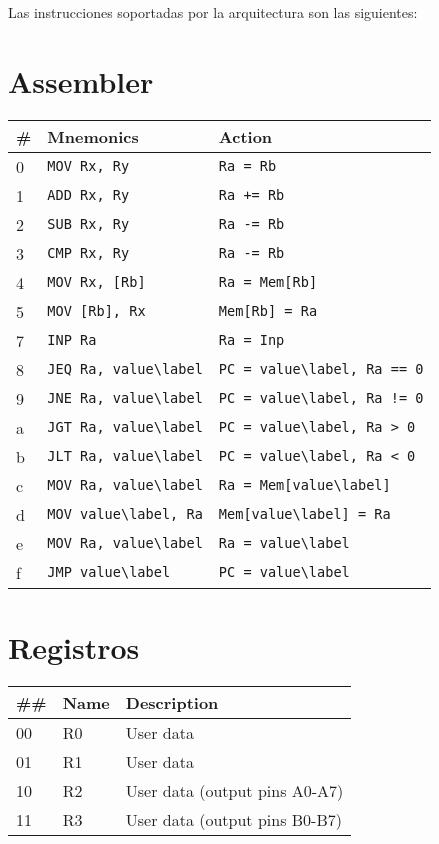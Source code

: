 \documentclass[12pt,twoside]{templates/unerthesis}
\begin{document}
Las instrucciones soportadas por la arquitectura son las siguientes:

\hypertarget{assembler}{%
\section{Assembler}\label{assembler}}

\begin{longtable}[]{@{}lll@{}}
\toprule
\# & Mnemonics & Action\tabularnewline
\midrule
\endhead
0 & \texttt{MOV\ Rx,\ Ry} & \texttt{Ra\ =\ Rb}\tabularnewline
1 & \texttt{ADD\ Rx,\ Ry} & \texttt{Ra\ +=\ Rb}\tabularnewline
2 & \texttt{SUB\ Rx,\ Ry} & \texttt{Ra\ -=\ Rb}\tabularnewline
3 & \texttt{CMP\ Rx,\ Ry} & \texttt{Ra\ -=\ Rb}\tabularnewline
4 & \texttt{MOV\ Rx,\ {[}Rb{]}} & \texttt{Ra\ =\ Mem{[}Rb{]}}\tabularnewline
5 & \texttt{MOV\ {[}Rb{]},\ Rx} & \texttt{Mem{[}Rb{]}\ =\ Ra}\tabularnewline
7 & \texttt{INP\ Ra} & \texttt{Ra\ =\ Inp}\tabularnewline
8 & \texttt{JEQ\ Ra,\ value\textbackslash{}\textbar{}label} & \texttt{PC\ =\ value\textbackslash{}\textbar{}label,\ Ra\ ==\ 0}\tabularnewline
9 & \texttt{JNE\ Ra,\ value\textbackslash{}\textbar{}label} & \texttt{PC\ =\ value\textbackslash{}\textbar{}label,\ Ra\ !=\ 0}\tabularnewline
a & \texttt{JGT\ Ra,\ value\textbackslash{}\textbar{}label} & \texttt{PC\ =\ value\textbackslash{}\textbar{}label,\ Ra\ \textgreater{}\ 0}\tabularnewline
b & \texttt{JLT\ Ra,\ value\textbackslash{}\textbar{}label} & \texttt{PC\ =\ value\textbackslash{}\textbar{}label,\ Ra\ \textless{}\ 0}\tabularnewline
c & \texttt{MOV\ Ra,\ value\textbackslash{}\textbar{}label} & \texttt{Ra\ =\ Mem{[}value\textbackslash{}\textbar{}label{]}}\tabularnewline
d & \texttt{MOV\ value\textbackslash{}\textbar{}label,\ Ra} & \texttt{Mem{[}value\textbackslash{}\textbar{}label{]}\ =\ Ra}\tabularnewline
e & \texttt{MOV\ Ra,\ value\textbackslash{}\textbar{}label} & \texttt{Ra\ =\ value\textbackslash{}\textbar{}label}\tabularnewline
f & \texttt{JMP\ value\textbackslash{}\textbar{}label} & \texttt{PC\ =\ value\textbackslash{}\textbar{}label}\tabularnewline
\bottomrule
\end{longtable}

\hypertarget{registros}{%
\section{Registros}\label{registros}}

\begin{longtable}[]{@{}lll@{}}
\toprule
\#\# & Name & Description\tabularnewline
\midrule
\endhead
00 & R0 & User data\tabularnewline
01 & R1 & User data\tabularnewline
10 & R2 & User data (output pins A0-A7)\tabularnewline
11 & R3 & User data (output pins B0-B7)\tabularnewline
\bottomrule
\end{longtable}
\end{document}
